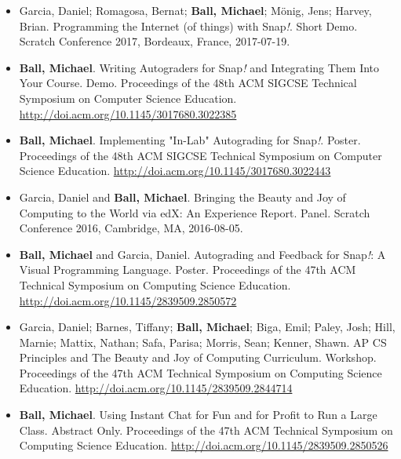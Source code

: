 \begin{itemize}
    \item{Garcia, Daniel; Romagosa, Bernat; \textbf{Ball, Michael}; Mönig, Jens; Harvey, Brian. Programming the Internet (of things) with Snap\textit{!}. Short Demo. Scratch Conference 2017, Bordeaux, France, 2017-07-19.}

    \item{\textbf{Ball, Michael}. Writing Autograders for Snap\textit{!} and Integrating Them Into Your Course. Demo. Proceedings of the 48th ACM SIGCSE Technical Symposium on Computer Science Education.} \href{http://doi.acm.org/10.1145/3017680.3022385}{http://doi.acm.org/10.1145/3017680.3022385}

    \item{\textbf{Ball, Michael}. Implementing "In-Lab" Autograding for Snap\textit{!}. Poster. Proceedings of the 48th ACM SIGCSE Technical Symposium on Computer Science Education.} \newline\href{http://doi.acm.org/10.1145/3017680.3022443}{http://doi.acm.org/10.1145/3017680.3022443}
    

    \item{Garcia, Daniel and \textbf{Ball, Michael}. Bringing the Beauty and Joy of Computing to the World via edX: An Experience Report. Panel. Scratch Conference 2016, Cambridge, MA, 2016-08-05.}

    \item{\textbf{Ball, Michael} and Garcia, Daniel. Autograding and Feedback for Snap\textit{!}: A Visual Programming Language. Poster. Proceedings of the 47th ACM Technical Symposium on Computing Science Education.}
    \href{http://doi.acm.org/10.1145/2839509.2850572}{http://doi.acm.org/10.1145/2839509.2850572}

    \item{Garcia, Daniel; Barnes, Tiffany; \textbf{Ball, Michael}; Biga, Emil; Paley, Josh; Hill, Marnie; Mattix, Nathan; Safa, Parisa; Morris, Sean; Kenner, Shawn. AP CS Principles and The Beauty and Joy of Computing Curriculum. Workshop. Proceedings of the 47th ACM Technical Symposium on Computing Science Education.} \href{http://doi.acm.org/10.1145/2839509.2844714}{http://doi.acm.org/10.1145/2839509.2844714}

    \item{\textbf{Ball, Michael}. Using Instant Chat for Fun and for Profit to Run a Large Class. Abstract Only. Proceedings of the 47th ACM Technical Symposium on Computing Science Education.} \href{http://doi.acm.org/10.1145/2839509.2850526}{http://doi.acm.org/10.1145/2839509.2850526}
    

\end{itemize}
